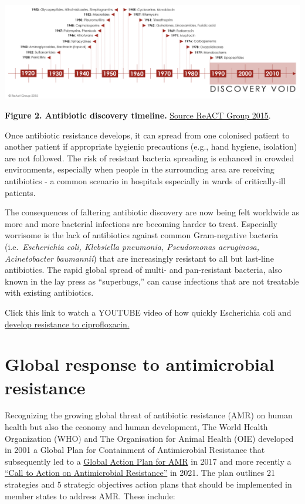 \documentclass[
]{book}
\begin{document}
\includegraphics[width=8.33333in,height=\textheight]{images/ab-discovery-timeline.png}

\textbf{Figure 2. Antibiotic discovery timeline.} \href{https://www.reactgroup.org/}{Source ReACT Group 2015}.

Once antibiotic resistance develops, it can spread from one colonised patient to another patient if appropriate hygienic precautions (e.g., hand hygiene, isolation) are not followed. The risk of resistant bacteria spreading is enhanced in crowded environments, especially when people in the surrounding area are receiving antibiotics - a common scenario in hospitals especially in wards of critically-ill patients.

The consequences of faltering antibiotic discovery are now being felt worldwide as more and more bacterial infections are becoming harder to treat. Especially worrisome is the lack of antibiotics against common Gram-negative bacteria (i.e.~\emph{Escherichia coli, Klebsiella pneumonia, Pseudomonas aeruginosa, Acinetobacter baumannii}) that are increasingly resistant to all but last-line antibiotics. The rapid global spread of multi- and pan-resistant bacteria, also known in the lay press as ``superbugs,'' can cause infections that are not treatable with existing antibiotics.

Click this link to watch a YOUTUBE video of how quickly Escherichia coli and \href{https://www.youtube.com/watch?v=bDa4-nSc7J8}{develop resistance to ciprofloxacin.}

\hypertarget{global-response-to-antimicrobial-resistance}{%
\section*{Global response to antimicrobial resistance}\label{global-response-to-antimicrobial-resistance}}

Recognizing the growing global threat of antibiotic resistance (AMR) on human health but also the economy and human development, The World Health Organization (WHO) and The Organisation for Animal Health (OIE) developed in 2001 a Global Plan for Containment of Antimicrobial Resistance that subsequently led to a \href{https://www.who.int/publications/i/item/9789241509763}{Global Action Plan for AMR} in 2017 and more recently a \href{https://www.who.int/news/item/30-07-2021-call-to-action-on-antimicrobial-resistance-2021}{``Call to Action on Antimicrobial Resistance''} in 2021. The plan outlines 21 strategies and 5 strategic objectives action plans that should be implemented in member states to address AMR. These include:
\end{document}

